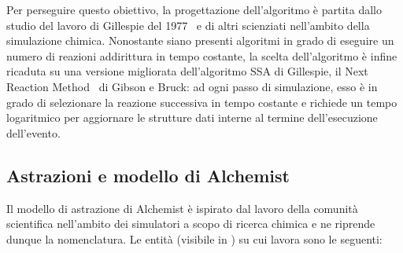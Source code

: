             Per perseguire questo obiettivo, la progettazione dell'algoritmo è partita dallo studio del lavoro di Gillespie del 1977~\cite{gillespie1977} e di altri scienziati nell'ambito della simulazione chimica. Nonostante siano presenti algoritmi in grado di eseguire un numero di reazioni addirittura in tempo costante, la scelta dell'algoritmo è infine ricaduta su una versione migliorata dell'algoritmo SSA di Gillespie, il Next Reaction Method~\cite{nextReactionMethod} di Gibson e Bruck: ad ogni passo di simulazione, esso è in grado di selezionare la reazione successiva in tempo costante e richiede un tempo logaritmico per aggiornare le strutture dati interne al termine dell'esecuzione dell'evento.

        \subsection{Astrazioni e modello di Alchemist}\label{sub:modello}
            Il modello di astrazione di Alchemist è ispirato dal lavoro della comunità scientifica nell'ambito dei simulatori a scopo di ricerca chimica e ne riprende dunque la nomenclatura.
            Le entità (visibile in ) su cui lavora sono le seguenti:

